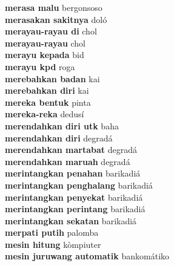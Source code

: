 \textbf{ merasa malu  } bergonsoso \\
\textbf{ merasakan sakitnya  } doló \\
\textbf{ merayau-rayau di  } chol \\
\textbf{ merayau-rayau  } chol \\
\textbf{ merayu kepada  } bid \\
\textbf{ merayu kpd  } roga \\
\textbf{ merebahkan badan  } kai \\
\textbf{ merebahkan diri  } kai \\
\textbf{ mereka bentuk  } pinta \\
\textbf{ mereka-reka  } dedusí \\
\textbf{ merendahkan diri utk  } baha \\
\textbf{ merendahkan diri  } degradá \\
\textbf{ merendahkan martabat  } degradá \\
\textbf{ merendahkan maruah  } degradá \\
\textbf{ merintangkan penahan  } barikadiá \\
\textbf{ merintangkan penghalang  } barikadiá \\
\textbf{ merintangkan penyekat  } barikadiá \\
\textbf{ merintangkan perintang  } barikadiá \\
\textbf{ merintangkan sekatan  } barikadiá \\
\textbf{ merpati putih  } palomba \\
\textbf{ mesin hitung  } kòmpiuter \\
\textbf{ mesin juruwang automatik  } bankomátiko \\
